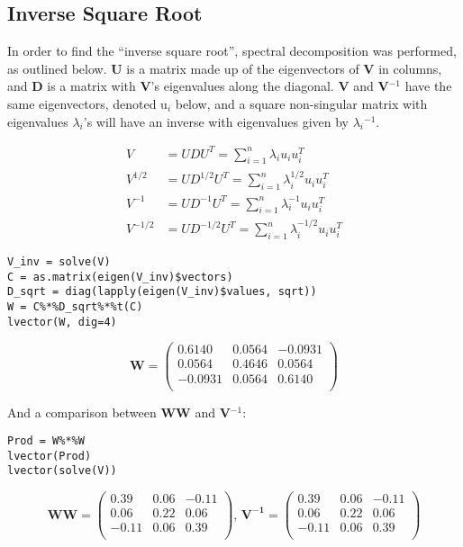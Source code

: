 \documentclass[11pt]{article}
\begin{document}
\subsection{Inverse Square Root}
\label{sec-2-2}


In order to find the ``inverse square root'', spectral
decomposition was performed, as outlined below. \textbf{U} is a matrix made up
of the eigenvectors of \textbf{V} in columns, and \textbf{D} is a matrix with \textbf{V}'s
eigenvalues along the diagonal. \textbf{V} and \textbf{V$^{\mathrm{-1}}$} have the same
eigenvectors, denoted u$_i$ below, and a square non-singular matrix with eigenvalues $\lambda$$_i$'s
will have an inverse with eigenvalues given by $\lambda$$_i$$^{\mathrm{-1}}$.

\begin{align*}
V &= U D U^T = \sum_{i=1}^{n} \lambda_i u_i u_i^T\\
V^{1/2} &= U D^{1/2} U^T = \sum_{i=1}^{n} \lambda_i^{1/2} u_i u_i^T\\
V^{-1} &= U D^{-1} U^T = \sum_{i=1}^{n} \lambda_i^{-1} u_i u_i^T\\
V^{-1/2} &= U D^{-1/2} U^T = \sum_{i=1}^{n} \lambda_i^{-1/2} u_i u_i^T
\end{align*}


\begin{verbatim}
V_inv = solve(V)
C = as.matrix(eigen(V_inv)$vectors)
D_sqrt = diag(lapply(eigen(V_inv)$values, sqrt))
W = C%*%D_sqrt%*%t(C)
lvector(W, dig=4)
\end{verbatim}

\[
\mathbf{W} =
\begin{pmatrix}{}
  0.6140 & 0.0564 & -0.0931 \\ 
  0.0564 & 0.4646 & 0.0564 \\ 
  -0.0931 & 0.0564 & 0.6140 \\ 
  \end{pmatrix}
\]

And a comparison between \textbf{WW} and \textbf{V$^{\mathrm{-1}}$}:


\begin{verbatim}
Prod = W%*%W
lvector(Prod)
lvector(solve(V))
\end{verbatim}

\[
\mathbf{WW} = 
\begin{pmatrix}{}
  0.39 & 0.06 & -0.11 \\ 
  0.06 & 0.22 & 0.06 \\ 
  -0.11 & 0.06 & 0.39 \\ 
  \end{pmatrix},\,
\mathbf{V^{-1}} =
\begin{pmatrix}{}
  0.39 & 0.06 & -0.11 \\ 
  0.06 & 0.22 & 0.06 \\ 
  -0.11 & 0.06 & 0.39 \\ 
  \end{pmatrix}
\]
\end{document}
